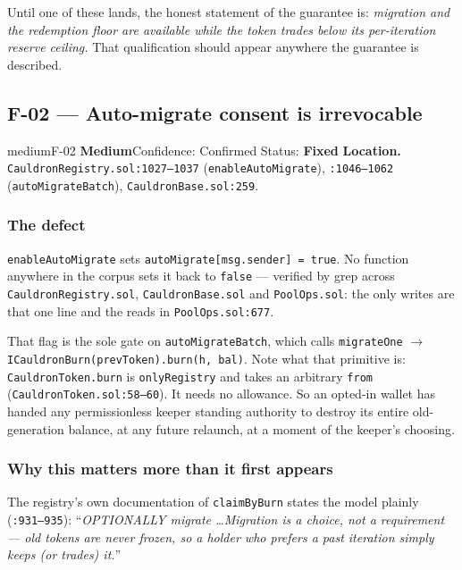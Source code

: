 \documentclass[11pt,a4paper]{article}
\newcommand{\code}[1]{\texttt{\small #1}}
\newcommand{\fileref}[1]{\texttt{\scriptsize #1}}
\begin{document}
\noindent Until one of these lands, the honest statement of the guarantee is:
\emph{migration and the redemption floor are available while the token trades below
its per-iteration reserve ceiling.} That qualification should appear anywhere the
guarantee is described.

\newpage
\subsection{F-02 --- Auto-migrate consent is irrevocable}

\begin{findingbox}{medium}{F-02 \quad \textbf{Medium}\quad Confidence: Confirmed \quad Status: \textbf{Fixed}}
\textbf{Location.} \fileref{CauldronRegistry.sol:1027--1037} (\code{enableAutoMigrate}),
\fileref{:1046--1062} (\code{autoMigrateBatch}), \fileref{CauldronBase.sol:259}.
\end{findingbox}

\subsubsection*{The defect}

\code{enableAutoMigrate} sets \code{autoMigrate[msg.sender] = true}. No function
anywhere in the corpus sets it back to \code{false} --- verified by grep across
\code{CauldronRegistry.sol}, \code{CauldronBase.sol} and \code{PoolOps.sol}: the
only writes are that one line and the reads in
\fileref{PoolOps.sol:677}.

That flag is the sole gate on \code{autoMigrateBatch}, which calls
\code{migrateOne} $\rightarrow$ \code{ICauldronBurn(prevToken).burn(h, bal)}. Note
what that primitive is: \code{CauldronToken.burn} is \code{onlyRegistry} and takes
an arbitrary \code{from} (\fileref{CauldronToken.sol:58--60}). It needs no
allowance. So an opted-in wallet has handed any permissionless keeper standing
authority to destroy its entire old-generation balance, at any future relaunch, at
a moment of the keeper's choosing.

\subsubsection*{Why this matters more than it first appears}

The registry's own documentation of \code{claimByBurn} states the model plainly
(\fileref{:931--935}): ``\emph{OPTIONALLY migrate \dots Migration is a choice, not
a requirement --- old tokens are never frozen, so a holder who prefers a past
iteration simply keeps (or trades) it.}''
\end{document}
